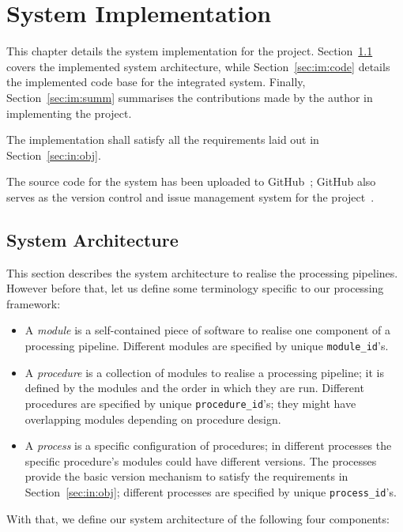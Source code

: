 \chapter{System Implementation}

This chapter details the system implementation for the project.
Section~\ref{sec:im:arch} covers the implemented system architecture, while
Section~\ref{sec:im:code} details the implemented code base for the integrated
system. Finally, Section~\ref{sec:im:summ} summarises the contributions
made by the author in implementing the project.

The implementation shall satisfy all the requirements laid out in
Section~\ref{sec:in:obj}.

The source code for the system has been uploaded to GitHub~\cite{gh-magor};
GitHub also serves as the version control and issue management
system for the project~\cite{gh-magor-is}.

\section{System Architecture}\label{sec:im:arch}

This section describes the system architecture to realise the processing
pipelines. However before that, let us define some terminology specific
to our processing framework:

\begin{itemize}
    \item A \textit{module} is a self-contained piece of software to realise
    one component of a processing pipeline. Different modules are specified
    by unique \texttt{module\_id}'s.
    \item A \textit{procedure} is a collection of modules to realise a
    processing pipeline; it is defined by the modules and the order in which
    they are run. Different procedures are specified by unique
    \texttt{procedure\_id}'s; they might have overlapping modules depending
    on procedure design.
    \item A \textit{process} is a specific configuration of procedures; in
    different processes the specific procedure's modules could have different
    versions. The processes provide the basic version mechanism to satisfy
    the requirements in Section~\ref{sec:in:obj}; different processes are
    specified by unique \texttt{process\_id}'s.
\end{itemize}

With that, we define our system architecture of the following four components:

